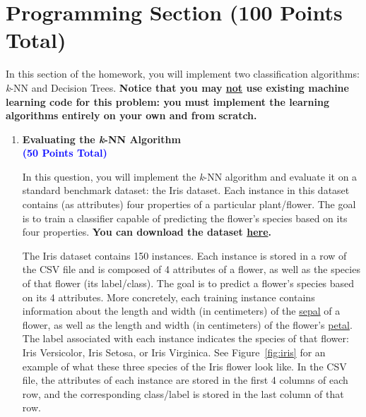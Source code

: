 \documentclass[]{article}
\newcommand{\HIGHLIGHT}[1]{\textcolor{blue}{\textbf{#1}}}
\begin{document}
\newpage

\vspace{1cm}
\section*{Programming Section (100 Points Total)}

In this section of the homework, you will implement two classification algorithms: \textit{k}-NN and Decision Trees. \textbf{Notice that you may \ul{not} use existing machine learning code for this problem: you must implement the learning algorithms entirely on your own and from scratch.} 
    
\vspace{0.35in}

\begin{enumerate}
    \item {\LARGE{\textbf{Evaluating the \textit{k}-NN Algorithm}}}\\\HIGHLIGHT{(50 Points Total)}\\
    \vspace{0.1in}
    
    In this question, you will implement the \textit{k}-NN algorithm and evaluate it on a standard benchmark dataset: the Iris dataset. Each instance in this dataset contains (as attributes) four properties of a particular plant/flower. The goal is to train a classifier capable of predicting the flower's species based on its four properties. \textbf{You can download the dataset \href{https://people.cs.umass.edu/~bsilva/courses/CMPSCI_589/Spring2022/homeworks/datasets/iris.csv}{here}.}
    
    The Iris dataset contains 150 instances. Each instance is stored in a row of the CSV file and is composed of 4 attributes of a flower, as well as the species of that flower (its label/class). The goal is to predict a flower's species based on its 4 attributes. More concretely, each training instance contains information about the length and width (in centimeters) of the \href{https://en.wikipedia.org/wiki/Sepal}{sepal} of a flower, as well as the length and width (in centimeters) of the flower's \href{https://en.wikipedia.org/wiki/Petal}{petal}. The label associated with each instance indicates the species of that flower: Iris Versicolor, Iris Setosa, or Iris Virginica. See Figure~\ref{fig:iris} for an example of what these three species of the Iris flower look like.
    In the CSV file, the attributes of each instance are stored in the first 4 columns of each row, and the corresponding class/label is stored in the last column of that row.
    

\end{enumerate}
\end{document}

